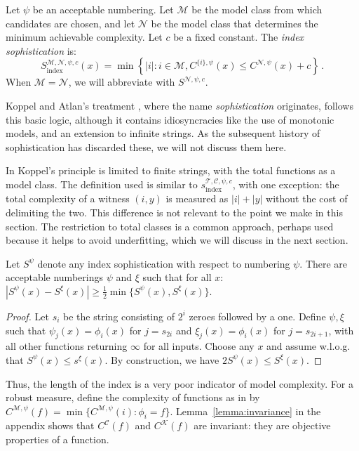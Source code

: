 \documentclass{style/llncs}
\newcommand{\M}{\mathscr M}
\newcommand{\C}{\mathscr C}
\newcommand{\T}{\mathscr T}
\newcommand{\K}{\mathscr K}
\newcommand{\Nm}{\mathscr N}
\newcommand{\s}{S}
\newcommand{\p}{\,\text{.}}
\begin{document}
\begin{definition}
Let $\psi$ be an acceptable numbering. Let $\M$ be the model class from which candidates are chosen, and let $\Nm$ be the model class that determines the minimum achievable complexity. Let $c$ be a fixed constant. The \emph{index sophistication} is:
\[
\s_{\text{index}}^{\M,\Nm,\psi,c}(x) = \min\left\{ |i| : i \in \M, C^{\{i\}, \psi}(x) \leq C^{\Nm, \psi}(x)+c   \right\} \p
\]
When $\M = \Nm$, we will abbreviate with $\s^{\Nm,\psi,c}$. \label{definition:index}
\end{definition}
Koppel and Atlan's treatment \cite{koppelSoph1988,koppel1991almost}, where the name \emph{sophistication} originates, follows this basic logic, although it contains idiosyncracies like the use of monotonic models, and an extension to infinite strings. As the subsequent history of sophistication has discarded these, we will not discuss them here.

In \cite{antunes2009sophistication,antunes2013sophistication} Koppel's principle is limited to finite strings, with the total functions as a model class. The definition used is similar to $s_\text{index}^{\T, \C,\psi,c}$, with one exception: the total complexity of a witness $(i,y)$ is measured as $|i|+|y|$ without the cost of delimiting the two. This difference is not relevant to the point we make in this section. The restriction to total classes is a common approach, perhaps used because it helps to avoid underfitting, which we will discuss in the next section. 

\begin{lemma}
Let $\s^\psi$ denote any index sophistication with respect to numbering $\psi$.
There are acceptable numberings $\psi$ and $\xi$ such that for all $x$:\\
\-\hspace{2.8em} $|\s^\psi(x) - \s^\xi(x)|\geq \tfrac{1}{2}\min\{\s^\psi(x),\s^\xi(x)\}$.
\end{lemma}
\begin{proof}
Let $s_i$ be the string consisting of $2^{i}$ zeroes followed by a one. Define $\psi, \xi$ such that $\psi_j(x) = \phi_i(x)$ for $j = s_{2i}$ and $\xi_j(x) = \phi_i(x)$ for $j = s_{2i+1}$, with all other functions returning $\infty$ for all inputs. Choose any $x$ and assume w.l.o.g. that $\s^\psi(x)\le s^\xi(x)$. By construction, we have $2\s^\psi(x)  \leq \s^\xi(x)$.
\end{proof}
Thus, the length of the index is a very poor indicator of model complexity. For a robust measure, define the complexity of functions as in \cite{grunwald2004shannon,vitanyi2004meaningful} by $C^{\M,\psi}(f) = \min\{C^{\M,\psi}(i):\phi_i=f\}$.
Lemma~\ref{lemma:invariance} in the appendix shows that $C^\C(f)$ and $C^\K(f)$ are invariant: they are objective properties of a function.
\end{document}
